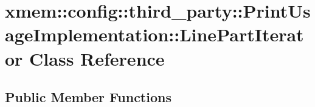\hypertarget{classxmem_1_1config_1_1third__party_1_1_print_usage_implementation_1_1_line_part_iterator}{}\section{xmem\+:\+:config\+:\+:third\+\_\+party\+:\+:Print\+Usage\+Implementation\+:\+:Line\+Part\+Iterator Class Reference}
\label{classxmem_1_1config_1_1third__party_1_1_print_usage_implementation_1_1_line_part_iterator}
\subsection*{Public Member Functions}
